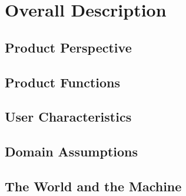 \section{Overall Description}

\subsection{Product Perspective}

\subsection{Product Functions}

\subsection{User Characteristics}

\subsection{Domain Assumptions}

\subsection{The World and the Machine}